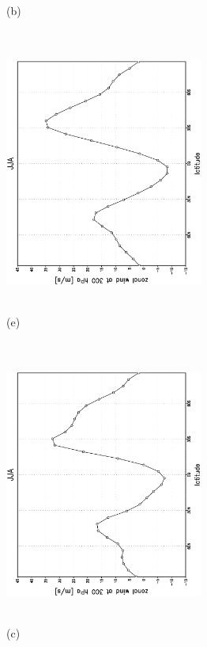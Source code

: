 \documentclass[12pt,a4paper,twoside,openright,headinclude,liststotoc,bibtotoc]{scrreprt}
\begin{document}
\begin{appendix}
\begin{figure}[c]
{}
\parbox{8.5cm}{\hspace{0.80cm} \begin{scriptsize}(b) \end{scriptsize} \vspace{-0.5cm} \\
\includegraphics[height=8.5cm,width=6.5cm,angle=-90]
{eps/zonysmu_300JJA.eps}
}
\parbox{8.5cm}{\hspace{0.80cm} \begin{scriptsize}(e) \end{scriptsize} \vspace{-0.5cm} \\
\includegraphics[height=8.5cm,width=6.5cm,angle=-90]
{eps/t21zonysmuvel131JJA300.eps}
}
\parbox{8.5cm}{\hspace{0.80cm} \begin{scriptsize}(c) \end{scriptsize} \vspace{-0.5cm} \\
}
\end{figure}
\end{appendix}
\end{document}
